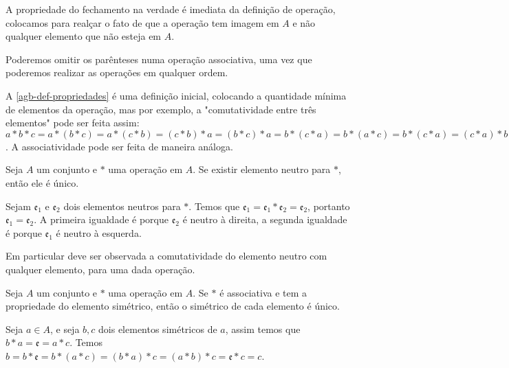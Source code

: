 \documentclass[../main.tex]{subfiles}
\begin{document}
A propriedade do fechamento na verdade é imediata da definição de operação, colocamos para realçar o fato de que a operação tem imagem em $A$ e não qualquer elemento que não esteja em $A$.

Poderemos omitir os parênteses numa operação associativa, uma vez que poderemos realizar as operações em qualquer ordem.

A \cref{agb-def-propriedades} é uma definição inicial, colocando a quantidade mínima de elementos da operação, mas por exemplo, a "comutatividade entre três elementos" pode ser feita assim: $a * b * c = a * (b*c) = a*(c*b) = (c*b)*a = (b*c)*a = b*(c*a) = b*(a*c) =b*(c*a) =(c*a)*b = c * a * b$. A associatividade pode ser feita de maneira análoga.

\begin{teo}\label{agb-neutro-unico}
    Seja $A$ um conjunto e $*$ uma operação em $A$. Se existir elemento neutro para $*$, então ele é único.
\end{teo}
\begin{dem}
    Sejam $\mathfrak{e_1}$ e $\mathfrak{e_2}$ dois elementos neutros para $*$. Temos que $\mathfrak{e_1} = \mathfrak{e_1}* \mathfrak{e_2} = \mathfrak{e_2}$, portanto $\mathfrak{e_1} = \mathfrak{e_2}$. A primeira igualdade é porque $\mathfrak{e_2}$ é neutro à direita, a segunda igualdade é porque $\mathfrak{e_1}$ é neutro à esquerda.
\end{dem}
Em particular deve ser observada a comutatividade do elemento neutro com qualquer elemento, para uma dada operação.

\begin{teo}\label{agb-teo-simetricoUnico}
    Seja $A$ um conjunto e $*$ uma operação em $A$. Se $*$ é associativa e tem a propriedade do elemento simétrico, então o simétrico de cada elemento é único.
\end{teo}
\begin{dem}
    Seja $a \in A$, e seja $b, c$ dois elementos simétricos de $a$, assim temos que $b*a = \mathfrak{e} = a*c$. 
    Temos $b = b * \mathfrak{e} = b * (a * c) = (b * a) * c = ( a * b ) * c = \mathfrak{e} * c = c$.
\end{dem}
\end{document}
